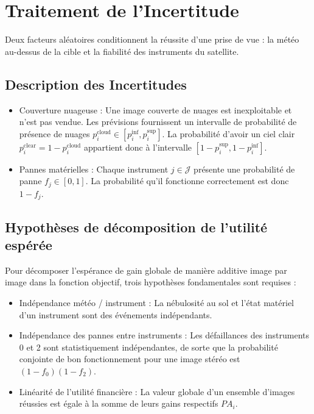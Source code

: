 \section{Traitement de l'Incertitude}

Deux facteurs aléatoires conditionnent la réussite d'une prise de vue : la météo au-dessus de la cible et la fiabilité des instruments du satellite.

\subsection{Description des Incertitudes}
\begin{itemize}
    \item Couverture nuageuse : Une image couverte de nuages est inexploitable et n'est pas vendue. Les prévisions fournissent un intervalle de probabilité de présence de nuages $p_i^{\text{cloud}} \in [p_i^{\inf}, p_i^{\sup}]$. La probabilité d'avoir un ciel clair $p_i^{\text{clear}} = 1 - p_i^{\text{cloud}}$ appartient donc à l'intervalle $[1 - p_i^{\sup}, 1 - p_i^{\inf}]$.
    \item Pannes matérielles : Chaque instrument $j \in \mathcal{J}$ présente une probabilité de panne $f_j \in [0, 1]$. La probabilité qu'il fonctionne correctement est donc $1 - f_j$.
\end{itemize}

\subsection{Hypothèses de décomposition de l'utilité espérée}
Pour décomposer l'espérance de gain globale de manière additive image par image dans la fonction objectif, trois hypothèses fondamentales sont requises :
\begin{itemize}
    \item Indépendance météo / instrument : La nébulosité au sol et l'état matériel d'un instrument sont des événements indépendants.
    \item Indépendance des pannes entre instruments : Les défaillances des instruments 0 et 2 sont statistiquement indépendantes, de sorte que la probabilité conjointe de bon fonctionnement pour une image stéréo est $(1 - f_0)(1 - f_2)$.
    \item Linéarité de l'utilité financière : La valeur globale d'un ensemble d'images réussies est égale à la somme de leurs gains respectifs $PA_i$.
\end{itemize}

